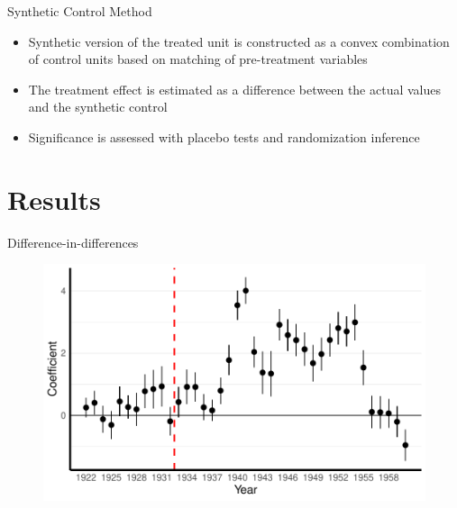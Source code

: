 \documentclass[11pt]{beamer}
\begin{document}
\begin{frame}{Synthetic Control Method}
\begin{itemize}
    \item Synthetic version of the treated unit is constructed as a convex combination of control units based on matching of pre-treatment variables
    \item The treatment effect is estimated as a difference between the actual
    values and the synthetic control
    \item Significance is assessed with placebo tests and randomization inference
\end{itemize}
\end{frame}
{
\section{Results}
}
\begin{frame}{Difference-in-differences}
 \begin{figure}[h]
\centering
\includegraphics[width=\textwidth]{fmla_pred_full_imp_date_no_trends_geopol_cr2.pdf}
\label{fig:did_effets}
\end{figure}
\end{frame}
\end{document}
